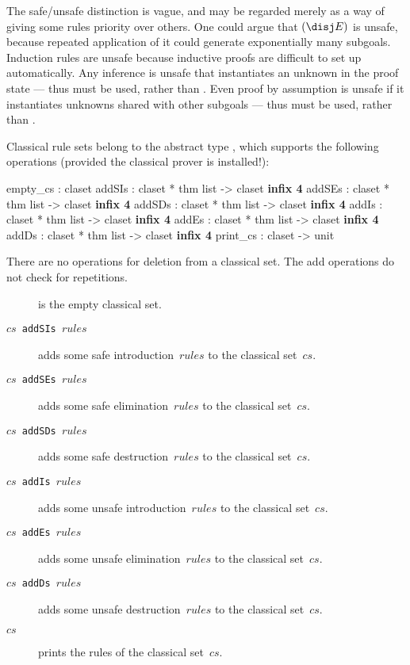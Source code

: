 The safe/unsafe distinction is vague, and may be regarded merely as a way
of giving some rules priority over others.  One could argue that
$({\disj}E)$ is unsafe, because repeated application of it could generate
exponentially many subgoals.  Induction rules are unsafe because inductive
proofs are difficult to set up automatically.  Any inference is unsafe that
instantiates an unknown in the proof state --- thus 
must be used, rather than .  Even proof by assumption
is unsafe if it instantiates unknowns shared with other subgoals --- thus
 must be used, rather than .

Classical rule sets belong to the abstract type , which
supports the following operations (provided the classical prover is
installed!):
\begin{ttbox} 
empty_cs : claset
addSIs   : claset * thm list -> claset                 \hfill{\bf infix 4}
addSEs   : claset * thm list -> claset                 \hfill{\bf infix 4}
addSDs   : claset * thm list -> claset                 \hfill{\bf infix 4}
addIs    : claset * thm list -> claset                 \hfill{\bf infix 4}
addEs    : claset * thm list -> claset                 \hfill{\bf infix 4}
addDs    : claset * thm list -> claset                 \hfill{\bf infix 4}
print_cs : claset -> unit
\end{ttbox}
There are no operations for deletion from a classical set.  The add
operations do not check for repetitions.
\begin{description}
\item[] is the empty classical set.

\item[\tt $cs$ addSIs $rules$] 
adds some safe introduction~$rules$ to the classical set~$cs$.

\item[\tt $cs$ addSEs $rules$] 
adds some safe elimination~$rules$ to the classical set~$cs$.

\item[\tt $cs$ addSDs $rules$] 
adds some safe destruction~$rules$ to the classical set~$cs$.

\item[\tt $cs$ addIs $rules$] 
adds some unsafe introduction~$rules$ to the classical set~$cs$.

\item[\tt $cs$ addEs $rules$] 
adds some unsafe elimination~$rules$ to the classical set~$cs$.

\item[\tt $cs$ addDs $rules$] 
adds some unsafe destruction~$rules$ to the classical set~$cs$.

\item[ $cs$] prints the rules of the classical set~$cs$.
\end{description}

